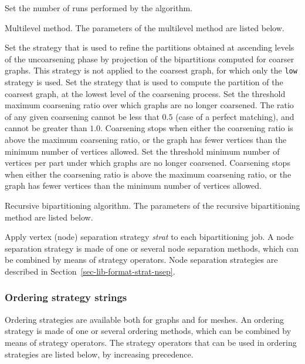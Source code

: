 \begin{itemize}
\begin{itemize}
\iteme[{\tt pass=}{\it nbr}]
Set the number of runs performed by the algorithm.
\end{itemize}
\iteme[{\tt m}]
Multilevel method. The parameters of the multilevel method are listed below.
\begin{itemize}
\iteme[{\tt asc=}{\it strat}]
Set the strategy that is used to refine the partitions obtained
at ascending levels of the uncoarsening phase by projection of the
bipartitions computed for coarser graphs.
This strategy is not applied to the coarsest graph, for which only the
{\tt low} strategy is used.
\iteme[{\tt low=}{\it strat}]
Set the strategy that is used to compute the partition of the
coarsest graph, at the lowest level of the coarsening process.
\iteme[{\tt rat=}{\it rat}]
Set the threshold maximum coarsening ratio over which graphs are no longer
coarsened. The ratio of any given coarsening cannot be less that $0.5$
(case of a perfect matching), and cannot be greater than $1.0$.
Coarsening stops when either the coarsening ratio is above the maximum
coarsening ratio, or the graph has fewer vertices than the minimum number of
vertices allowed.
\iteme[{\tt vert=}{\it nbr}]
Set the threshold minimum number of vertices per part under which
graphs are no longer coarsened. Coarsening stops when either the
coarsening ratio is above the maximum coarsening ratio, or the graph
has fewer vertices than the minimum number of vertices allowed.
\end{itemize}
\iteme[{\tt r}]
Recursive bipartitioning algorithm. The parameters of the recursive
bipartitioning method are listed below.
\begin{itemize}
\iteme[{\tt sep=}{\it strat}]
Apply vertex (node) separation strategy {\it strat\/} to each
bipartitioning job. A node separation strategy is made of one or
several node separation methods, which can be combined by means of
strategy operators. Node separation strategies are described in
Section~\ref{sec-lib-format-strat-nsep}.
\end{itemize}
\end{itemize}

\subsubsection{Ordering strategy strings}
\label{sec-lib-format-strat-ord}

Ordering strategies are available both for graphs and for meshes.
An ordering strategy is made of one or several ordering methods, which
can be combined by means of strategy operators. The strategy
operators that can be used in ordering strategies are listed below, by
increasing precedence.

